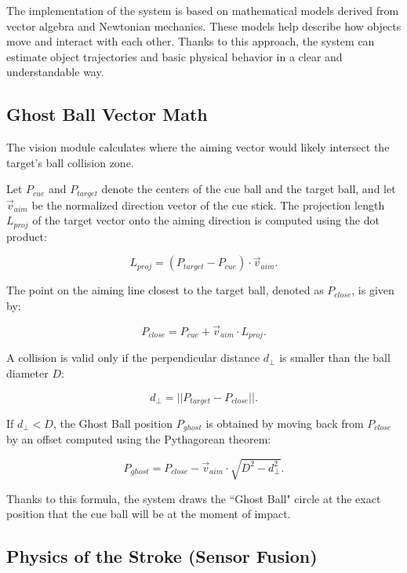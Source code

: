 The implementation of the system is based on mathematical models derived from vector algebra and Newtonian mechanics. These models help describe how objects move and interact with each other. Thanks to this approach, the system can estimate object trajectories and basic physical behavior in a clear and understandable way.
\subsection{Ghost Ball Vector Math}
The vision module calculates where the aiming vector would likely intersect the target's ball collision zone. 

Let $P_{cue}$ and $P_{target}$ denote the centers of the cue ball and the target ball, and let $\vec{v}_{aim}$ be the normalized direction vector of the cue stick. The projection length $L_{proj}$ of the target vector onto the aiming direction is computed using the dot product:

\begin{equation}
    L_{proj} = (P_{target} - P_{cue}) \cdot \vec{v}_{aim}.
\end{equation}

The point on the aiming line closest to the target ball, denoted as $P_{close}$, is given by:

\begin{equation}
    P_{close} = P_{cue} + \vec{v}_{aim} \cdot L_{proj}.
\end{equation}

A collision is valid only if the perpendicular distance $d_{\perp}$ is smaller than the ball diameter $D$:

\begin{equation}
    d_{\perp} = || P_{target} - P_{close} ||.
\end{equation}

If $d_{\perp} < D$, the Ghost Ball position $P_{ghost}$ is obtained by moving back from $P_{close}$ by an offset computed using the Pythagorean theorem:

\begin{equation}
    P_{ghost} = P_{close} - \vec{v}_{aim} \cdot \sqrt{D^2 - d_{\perp}^2}.
\end{equation}

Thanks to this formula, the system draws the ``Ghost Ball" circle at the exact position that the cue ball will be at the moment of impact.

\subsection{Physics of the Stroke (Sensor Fusion)}


